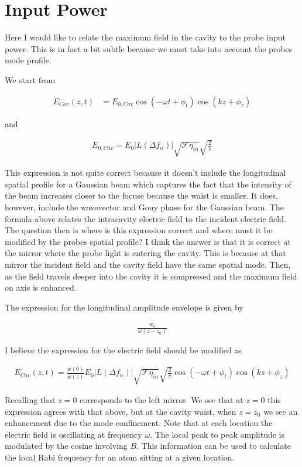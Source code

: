 \documentclass[12pt]{article}
\begin{document}
\section{Input Power}

Here I would like to relate the maximum field in the cavity to the probe input power. This is in fact a bit subtle because we must take into account the probes mode profile.

We start from

\begin{align}
E_{Cav}(z,t) &= E_{0,Cav} \cos\left(-\omega t + \phi_t\right)\cos\left(kz + \phi_z\right)
\end{align}

and

\begin{align}
E_{0,Cav} = E_0 |L(\Delta f_n)| \sqrt{\mathcal{F}\eta_{in}}\sqrt{\frac{2}{\pi}}
\end{align}

This expression is not quite correct because it doesn't include the longitudinal spatial profile for a Gaussian beam which captures the fact that the intensity of the beam increases closer to the focuse because the waist is smaller. It does, however, include the wavevector and Gouy phase for the Gaussian beam. The formula above relates the intracavity electric field to the incident electric field. The question then is where is this expression correct and where must it be modified by the probes spatial profile? I think the answer is that it is correct at the mirror where the probe light is entering the cavity. This is because at that mirror the incident field and the cavity field have the same spatial mode. Then, as the field travels deeper into the cavity it is compressed and the maximum field on axis is enhanced.

The expression for the longitudinal amplitude envelope is given by

\begin{align}
\frac{w_0}{w(z-z_0)}
\end{align}

I believe the expression for the electric field should be modified as

\begin{align}
E_{Cav}(z,t) = \frac{w(0)}{w(z)}E_0 |L(\Delta f_n)| \sqrt{\mathcal{F} \eta_{in}} \sqrt{\frac{2}{\pi}} \cos\left(-\omega t + \phi_t\right)\cos\left(kz + \phi_z\right)
\end{align}

Recalling that $z=0$ corresponds to the left mirror. We see that at $z=0$ this expression agrees with that above, but at the cavity waist, when $z=z_0$ we see an enhancement due to the mode confinement. Note that at each location the electric field is oscillating at frequency $\omega$. The local peak to peak amplitude is modulated by the cosine involving $B$. This information can be used to calculate the local Rabi frequency for an atom sitting at a given location.
\end{document}

